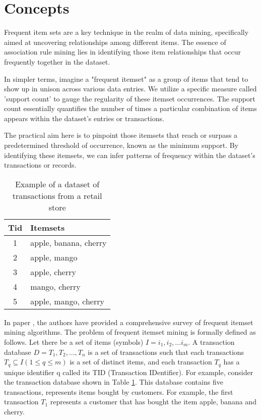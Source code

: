 \section{Concepts}
Frequent item sets are a key technique in the realm of data mining\cite{FIM_geeksforgeeks},
specifically aimed at uncovering relationships among different items.
The essence of association rule mining lies in identifying those item relationships that occur frequently together in the dataset.

In simpler terms, imagine a "frequent itemset" as a group of items that tend to show up in unison across various data entries. We utilize a specific measure called 'support count' to gauge the regularity of these itemset occurrences. The support count essentially quantifies the number of times a particular combination of items appears within the dataset's entries or transactions.

The practical aim here is to pinpoint those itemsets that reach or surpass a predetermined threshold of occurrence, known as the minimum support. By identifying these itemsets, we can infer patterns of frequency within the dataset's transactions or records.

\begin{table}[H]
    \centering
    \caption{Example of a dataset of transactions from a retail store}
    \label{tab:example_dataset_in_real}
    \begin{tabular}{|c|l|}
        \hline
        \textbf{Tid} & \textbf{Itemsets}     \\
        \hline
        1            & apple, banana, cherry \\
        2            & apple, mango          \\
        3            & apple, cherry         \\
        4            & mango, cherry         \\
        5            & apple, mango, cherry  \\
        \hline
    \end{tabular}
\end{table}

In paper \cite{survey_itemset_mining}, the authors have provided a comprehensive survey of frequent itemset mining algorithms.
The problem of frequent itemset mining is formally defined as follows.
Let there be a set of items (symbols) $I = {i_1, i_2, . . . i_m}$.
A transaction database $D = {T_1, T_2, . . ., T_n}$ is a set
of transactions such that each transactions $T_q \subseteq I(1 \leq q \leq m)$ is a set of distinct items,
and each transaction $T_q$ has a unique identifier q called its TID (Transaction IDentifier).
For example, consider the transaction database shown in Table \ref{tab:example_dataset_in_real}.
This database contains
five transactions, represents items bought by customers.
For example, the first transaction $T_1$ represents a customer that has bought the item apple, banana and cherry.

